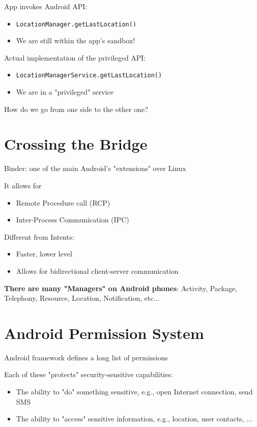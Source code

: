 \documentclass[11pt]{article}
\begin{document}
App invokes Android API:
\begin{itemize}
	\item \verb|LocationManager.getLastLocation()|
	\item We are still within the app's sandbox!
\end{itemize}

Actual implementation of the privileged API:
\begin{itemize}
	\item \verb|LocationManagerService.getLastLocation()|
	\item We are in a "privileged" service
\end{itemize}

How do we go from one side to the other one?

\section*{Crossing the Bridge}

Binder: one of the main Android's "extensions" over Linux

It allows for
\begin{itemize}
	\item Remote Procedure call (RCP)
	\item Inter-Process Communication (IPC)
\end{itemize}

Different from Intents:
\begin{itemize}
	\item Faster, lower level
	\item Allows for bidirectional client-server communication
\end{itemize}

\textbf{There are many "Managers" on Android phones}: Activity, Package, Telephony, Resource, Location, Notification, etc...

\section*{Android Permission System}

Android framework defines a long list of permissions

Each of these "protects" security-sensitive capabilities:
\begin{itemize}
	\item The ability to "do" something sensitive, e.g., open Internet connection, send SMS
	\item The ability to "access" sensitive information, e.g., location, user contacts, ...
\end{itemize}
\end{document}
